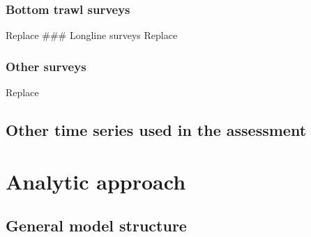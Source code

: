 \documentclass[11pt,
  english,
  a4paper,
]{article}
\begin{document}
\leavevmode\tagmcend\tagstructend


\hypertarget{bottom-trawl-surveys}{%
\subsubsection{Bottom trawl surveys}\label{bottom-trawl-surveys}}

\leavevmode\tagmcend\tagstructend


Replace \#\#\# Longline surveys Replace

\leavevmode\tagmcend\tagstructend\par


\hypertarget{other-surveys}{%
\subsubsection{Other surveys}\label{other-surveys}}

\leavevmode\tagmcend\tagstructend


Replace

\leavevmode\tagmcend\tagstructend\par


\hypertarget{other-time-series-used-in-the-assessment}{%
\subsection{Other time series used in the assessment}\label{other-time-series-used-in-the-assessment}}

\leavevmode\tagmcend\tagstructend


\hypertarget{analytic-approach}{%
\section{Analytic approach}\label{analytic-approach}}

\leavevmode\tagmcend\tagstructend


\hypertarget{general-model-structure}{%
\subsection{General model structure}\label{general-model-structure}}
\end{document}
